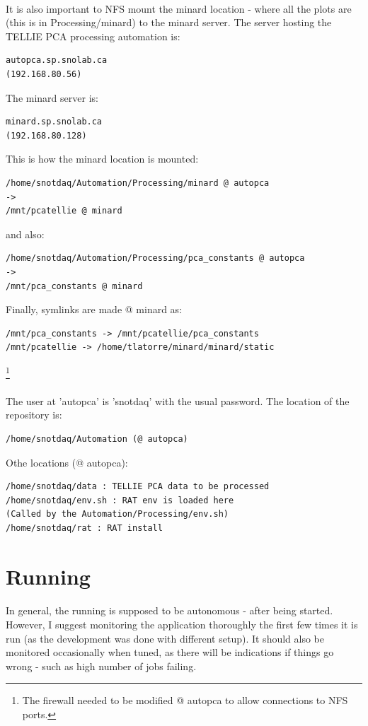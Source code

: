 \documentclass[12pt]{article}
\begin{document}
\paragraph{}
It is also important to NFS mount the minard location - where all the plots are (this is in Processing/minard) to the minard server. The server hosting the TELLIE PCA processing automation is:
\begin{lstlisting}
autopca.sp.snolab.ca
(192.168.80.56)
\end{lstlisting}
The minard server is:
\begin{lstlisting}
minard.sp.snolab.ca
(192.168.80.128)
\end{lstlisting}
This is how the minard location is mounted:
\begin{lstlisting}
/home/snotdaq/Automation/Processing/minard @ autopca
->
/mnt/pcatellie @ minard
\end{lstlisting}
and also:
\begin{lstlisting}
/home/snotdaq/Automation/Processing/pca_constants @ autopca
->
/mnt/pca_constants @ minard
\end{lstlisting}
Finally, symlinks are made @ minard as:
\begin{lstlisting}
/mnt/pca_constants -> /mnt/pcatellie/pca_constants
/mnt/pcatellie -> /home/tlatorre/minard/minard/static
\end{lstlisting}
\footnote{The firewall needed to be modified @ autopca to allow connections to NFS ports.}

\paragraph{}
The user at 'autopca' is 'snotdaq' with the usual password. The location of the repository is:
\begin{lstlisting}
/home/snotdaq/Automation (@ autopca)
\end{lstlisting}
Othe locations (@ autopca):
\begin{lstlisting}
/home/snotdaq/data : TELLIE PCA data to be processed
/home/snotdaq/env.sh : RAT env is loaded here
(Called by the Automation/Processing/env.sh)
/home/snotdaq/rat : RAT install
\end{lstlisting}

\section{Running}\label{sec:run}
\paragraph{}
In general, the running is supposed to be autonomous - after being started. However, I suggest monitoring the application thoroughly the first few times it is run (as the development was done with different setup). It should also be monitored occasionally when tuned, as there will be indications if things go wrong - such as high number of jobs failing. 
\end{document}
